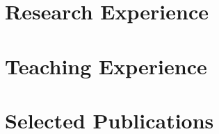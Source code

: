 \documentclass[margin,centered]{res}
\begin{document}
\begin{resume}
\section{\sc Research Experience}




\section{\sc Teaching Experience}




% 






\section{\sc Selected Publications}





% 





\end{resume}
\end{document}
